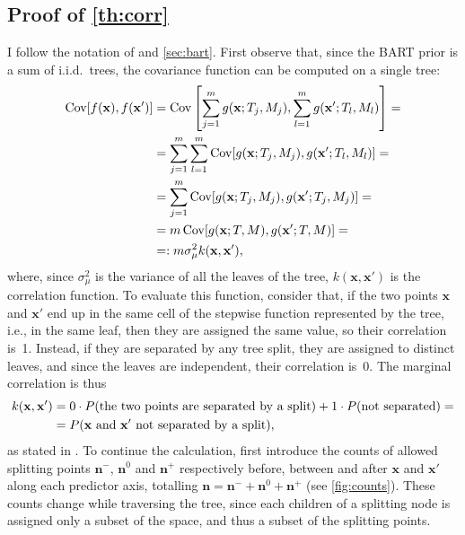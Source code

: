 \documentclass[a4paper]{article}
\theoremstyle{definition}
\begin{document}
    \subsection{Proof of \autoref{th:corr}}
    \label{sec:corrproof}
    
    I follow the notation of \textcite{chipman2010} and \autoref{sec:bart}. First observe that, since the BART prior is a sum of i.i.d.\ trees, the covariance function can be computed on a single tree:
    \begin{align}
        \operatorname{Cov}[f(\mathbf x), f(\mathbf x')]
        &= \operatorname{Cov} \left[
            \sum_{j=1}^m g(\mathbf x;T_j,M_j),
            \sum_{l=1}^m g(\mathbf x';T_l,M_l)
        \right] = \notag \\
        &= \sum_{j=1}^m \sum_{l=1}^m
        \operatorname{Cov}[g(\mathbf x;T_j,M_j), g(\mathbf x';T_l,M_l)] = \notag \\
        &= \sum_{j=1}^m
        \operatorname{Cov}[g(\mathbf x;T_j,M_j), g(\mathbf x';T_j,M_j)] = \notag \\
        &= m \operatorname{Cov}[g(\mathbf x;T,M), g(\mathbf x';T,M)] = \notag \\
        &=: m \sigma_\mu^2 k(\mathbf x, \mathbf x'),
    \end{align}
    where, since $\sigma_\mu^2$ is the variance of all the leaves of the tree,
    $k(\mathbf x, \mathbf x')$ is the correlation function. To evaluate this
    function, consider that, if the two points $\mathbf x$ and $\mathbf x'$
    end up in the same cell of the stepwise function represented by
    the tree, i.e., in the same leaf, then they are assigned the same value,
    so their correlation is~1. Instead, if they are separated by any tree split,
    they are assigned to distinct leaves, and since the leaves are independent,
    their correlation is~0. The marginal correlation is thus
    \begin{align}
        k(\mathbf x, \mathbf x')
        &= 0 \cdot P(\text{the two points are separated by a split}) + 1 \cdot P(\text{not separated}) = \notag \\
        &= P(\text{$\mathbf x$ and $\mathbf x'$ not separated by a split}),
    \end{align}
    as stated in \textcite[\S5.2]{linero2017}. To continue the calculation,
    first introduce the counts of allowed splitting points $\mathbf n^-$,
    $\mathbf n^0$ and $\mathbf n^+$ respectively before, between and after
    $\mathbf x$ and $\mathbf x'$ along each predictor axis, totalling $\mathbf
    n = \mathbf n^- + \mathbf n^0 + \mathbf n^+$ (see \autoref{fig:counts}).
    These counts change while traversing the tree, since each children of a
    splitting node is assigned only a subset of the space, and thus a subset of
    the splitting points.
    
\end{document}
